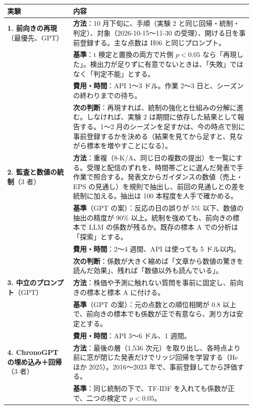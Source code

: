 \documentclass[xelatex,ja=standard,jafont=haranoaji,a4paper,10pt]{bxjsreport}
\begin{document}
\begin{longtable}{p{2.6cm}p{11.6cm}}
\toprule
\textbf{実験} & \textbf{内容} \\
\midrule
\endfirsthead
\bottomrule
\endfoot
\textbf{1. 前向きの再現}（最優先、GPT） & \textbf{方法}：10 月下旬に、手順（実験 2 と同じ回帰・統制・判定）、対象（2026-10-15〜11-30 の受理）、開ける日を事前登録する。主な点数は H06 と同じプロンプト。\\
& \textbf{基準}：t 検定と置換の両方で片側 $p<0.05$ なら「再現した」。検出力が足りずに有意でないときは、「失敗」ではなく「判定不能」とする。\\
& \textbf{費用・時間}：API 1〜3 ドル。作業 2〜3 日と、シーズンの終わりまでの待ち。\\
& \textbf{次の判断}：再現すれば、統制の強化と仕組みの分解に進む。しなければ、実験 2 は期間に依存した結果として報告する。1〜2 月のシーズンを足すかは、今の時点で別に事前登録するかを決める（結果を見てから足すと、見ながら標本を増やすことになる）。\\
\midrule
\textbf{2. 監査と数値の統制}（3 者） & \textbf{方法}：重複（8-K/A、同じ日の複数の提出）を一覧にする。受理と配信のずれを、時間帯ごとに選んだ発表で手作業で照合する。発表文からガイダンスの数値（売上・EPS の見通し）を規則で抽出し、前回の見通しとの差を統制に加える。抽出は 100 本程度を人手で確かめる。\\
& \textbf{基準}（GPT の案）：反応の日の誤りが 5\% 以下、数値の抽出の精度が 90\% 以上。統制を強めても、前向きの標本で LLM の係数が残るか。既存の標本 A での分析は「探索」とする。\\
& \textbf{費用・時間}：2〜4 週間、API は使っても 5 ドル以内。\\
& \textbf{次の判断}：係数が大きく縮めば「文章から数値の驚きを読んだ効果」、残れば「数値以外も読んでいる」。\\
\midrule
\textbf{3. 中立のプロンプト}（GPT） & \textbf{方法}：株価や予測に触れない質問を事前に固定し、前向きの標本と標本 A に付ける。\\
& \textbf{基準}（GPT の案）：元の点数との順位相関が 0.8 以上で、前向きの標本でも係数が正で有意なら、測り方は安定とする。\\
& \textbf{費用・時間}：API 3〜6 ドル、1 週間。\\
\midrule
\textbf{4. ChronoGPT の埋め込み＋回帰}（3 者） & \textbf{方法}：最後の層（1,536 次元）を取り出し、各時点より前に窓が閉じた発表だけでリッジ回帰を学習する（He ほか 2025）。2016〜2023 年で、事前登録してから評価する。\\
& \textbf{基準}：同じ統制の下で、TF-IDF を入れても係数が正で、二つの検定で $p<0.05$。\\

\end{longtable}
\end{document}
